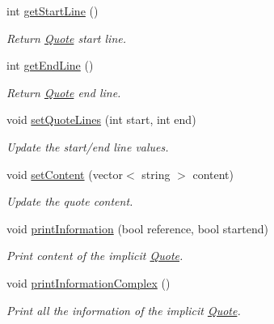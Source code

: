 \begin{DoxyCompactItemize}
int \hyperlink{class_quote_aa6f56a06332e13b6ee7b4261b8c69372}{get\-Start\-Line} ()
\begin{DoxyCompactList}\small\item\em Return \hyperlink{class_quote}{Quote} start line. \end{DoxyCompactList}\item 
int \hyperlink{class_quote_a145fbd53371ddcca8c63aee0feb7c2c9}{get\-End\-Line} ()
\begin{DoxyCompactList}\small\item\em Return \hyperlink{class_quote}{Quote} end line. \end{DoxyCompactList}\item 
void \hyperlink{class_quote_a211e2593b1ef18dc7fd4a5da87384fa1}{set\-Quote\-Lines} (int start, int end)
\begin{DoxyCompactList}\small\item\em Update the start/end line values. \end{DoxyCompactList}\item 
void \hyperlink{class_quote_ab3af36f8b5649b115fca7eecbb294a59}{set\-Content} (vector$<$ string $>$ content)
\begin{DoxyCompactList}\small\item\em Update the quote content. \end{DoxyCompactList}\item 
void \hyperlink{class_quote_a0854af3d11ff805991e87ef6e9bebf69}{print\-Information} (bool reference, bool startend)
\begin{DoxyCompactList}\small\item\em Print content of the implicit \hyperlink{class_quote}{Quote}. \end{DoxyCompactList}\item 
void \hyperlink{class_quote_ae6847b50fefd892540617426a832a1cf}{print\-Information\-Complex} ()
\begin{DoxyCompactList}\small\item\em Print all the information of the implicit \hyperlink{class_quote}{Quote}. \end{DoxyCompactList}\end{DoxyCompactItemize}
